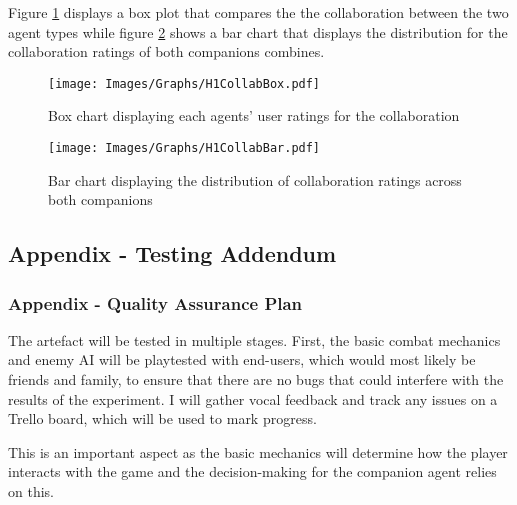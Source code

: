 \documentclass{IEEEtran}
\begin{document}
Figure \ref{fig:AppendixH1CollabBox} displays a box plot that compares the the collaboration between the two agent types while figure \ref{fig:AppendixH1CollabBar} shows a bar chart that displays the distribution for the collaboration ratings of both companions combines.

\begin{figure}[!h]
  \centering
  \texttt{[image: Images/Graphs/H1CollabBox.pdf]}
  
\caption{Box chart displaying each agents' user ratings for the collaboration}
\label{fig:AppendixH1CollabBox}
\end{figure}

\begin{figure}[!h]
  \centering
  \texttt{[image: Images/Graphs/H1CollabBar.pdf]}
  
\caption{Bar chart displaying the distribution of collaboration ratings across both companions}
\label{fig:AppendixH1CollabBar}
\end{figure}

\clearpage

\subsection{Appendix - Testing Addendum}
\label{AppendixTesting}

\subsubsection{Appendix - Quality Assurance Plan}
\label{AppendixQAPlan}


The artefact will be tested in multiple stages. First, the basic combat mechanics and enemy AI will be playtested with end-users, which would most likely be friends and family, to ensure that there are no bugs that could interfere with the results of the experiment. I will gather vocal feedback and track any issues on a Trello board, which will be used to mark progress.

This is an important aspect as the basic mechanics will determine how the player interacts with the game and the decision-making for the companion agent relies on this.
\end{document}
